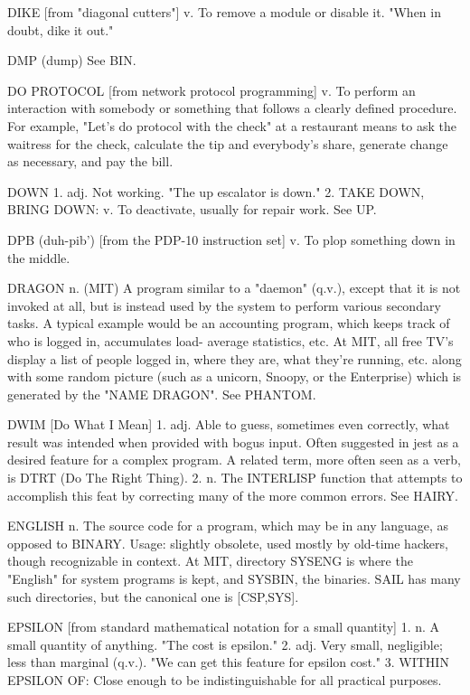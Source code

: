 DIKE [from "diagonal cutters"] v. To remove a module or disable it.
   "When in doubt, dike it out."

DMP (dump)  See BIN.

DO PROTOCOL [from network protocol programming] v. To perform an
   interaction with somebody or something that follows a clearly
   defined procedure.  For example, "Let's do protocol with the check"
   at a restaurant means to ask the waitress for the check, calculate
   the tip and everybody's share, generate change as necessary, and
   pay the bill.

DOWN 1. adj. Not working.  "The up escalator is down."	2. TAKE DOWN,
   BRING DOWN: v. To deactivate, usually for repair work.  See UP.

DPB (duh-pib') [from the PDP-10 instruction set] v. To plop something
   down in the middle.

DRAGON n. (MIT) A program similar to a "daemon" (q.v.), except that it
   is not invoked at all, but is instead used by the system to perform
   various secondary tasks.  A typical example would be an accounting
   program, which keeps track of who is logged in, accumulates load-
   average statistics, etc.  At MIT, all free TV's display a list of
   people logged in, where they are, what they're running, etc. along
   with some random picture (such as a unicorn, Snoopy, or the
   Enterprise) which is generated by the "NAME DRAGON".	 See PHANTOM.

DWIM [Do What I Mean] 1. adj. Able to guess, sometimes even correctly,
   what result was intended when provided with bogus input.  Often
   suggested in jest as a desired feature for a complex program.  A
   related term, more often seen as a verb, is DTRT (Do The Right
   Thing).  2. n. The INTERLISP function that attempts to accomplish
   this feat by correcting many of the more common errors.  See HAIRY.

ENGLISH n. The source code for a program, which may be in any
   language, as opposed to BINARY.  Usage: slightly obsolete, used
   mostly by old-time hackers, though recognizable in context.	At
   MIT, directory SYSENG is where the "English" for system programs is
   kept, and SYSBIN, the binaries.  SAIL has many such directories,
   but the canonical one is [CSP,SYS].

EPSILON [from standard mathematical notation for a small quantity] 1.
   n. A small quantity of anything.  "The cost is epsilon."  2. adj.
   Very small, negligible; less than marginal (q.v.).  "We can get
   this feature for epsilon cost."  3. WITHIN EPSILON OF: Close enough
   to be indistinguishable for all practical purposes.

